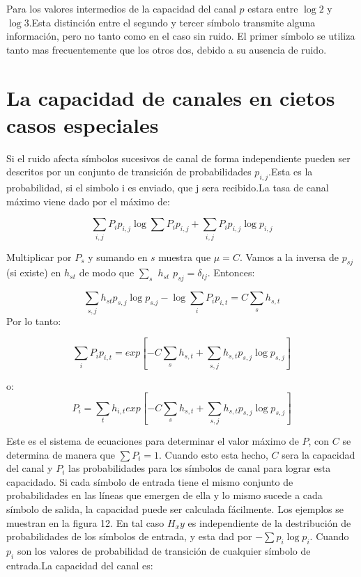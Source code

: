 Para los valores intermedios de la capacidad del canal $p$ estara entre $\log{2}$ y $\log{3}$.Esta distinci\'on 
entre el segundo y tercer s\'imbolo transmite alguna informaci\'on, pero no tanto como en el caso sin ruido.
El primer s\'imbolo se utiliza tanto mas frecuentemente que los otros dos, debido a su ausencia de ruido.

\section{La capacidad de canales en cietos casos especiales}

Si el ruido afecta s\'imbolos sucesivos de canal de forma independiente pueden ser descritos por un conjunto de transici\'on 
de probabilidades $p_{i,j}$.Esta es la probabilidad, si el simbolo i es enviado, que j sera recibido.La tasa de canal m\'aximo 
viene dado por el m\'aximo de:

\begin{equation}
  \sum_{i,j}P_i p_{i,j} \log{\sum{P_i p_{i,j}}} + \sum_{i,j}P_i p_{i,j}\log{p_{i,j}}
\end{equation}
 
Multiplicar por $P_s$ y sumando en $s$ muestra que $\mu = C$. Vamos a la inversa de $p_{sj}$ (si existe) en $h_{st}$  de modo que 
$\sum_{s}$ $h_{st}$ $p_{sj} = \delta_{tj}$. Entonces: 

\begin{equation}
  \sum_{s,j}h_{st} p_{s,j} \log{p_{s.j}} - \log{\sum_{i}P_i p_{i,t}} = C \sum_{s} h_{s,t}
\end{equation}
Por lo tanto:

\begin{equation}
  \sum_{i} P_i p_{i,t} = exp[- C \sum_{s} h_{s,t}+ \sum_{s,j} h_{s,t} p_{s,j} \log{p_{s,j}}]
\end{equation}

o:  
\begin{equation}
  P_i = \sum_{t} h_{i,t} exp[ - C \sum_{s} h_{s,t}+ \sum_{s,j} h_{s,t} p_{s,j} \log{p_{s,j}} ]
\end{equation}


Este es el sistema de ecuaciones para determinar el valor m\'aximo de $P$, con $C$ se determina 
de manera que $\sum P_i = 1$. Cuando esto esta hecho, $C$ sera la capacidad del canal y $P_i$ las probabilidades 
para los s\'imbolos de canal para lograr esta capacidado.
Si cada s\'imbolo de entrada tiene el mismo conjunto de probabilidades en las l\'ineas que emergen de ella 
y lo mismo sucede a cada s\'imbolo de salida, la capacidad puede ser calculada f\'acilmente. Los ejemplos se muestran en la figura 12. 
En tal caso $H_xy$ es independiente de la destribuci\'on de probabilidades de los s\'imbolos de entrada, y esta dad por $-\sum p_i \log{p_i}$. 
Cuando $p_i$ son los valores de probabilidad de transici\'on de cualquier s\'imbolo de entrada.La capacidad del canal es:

